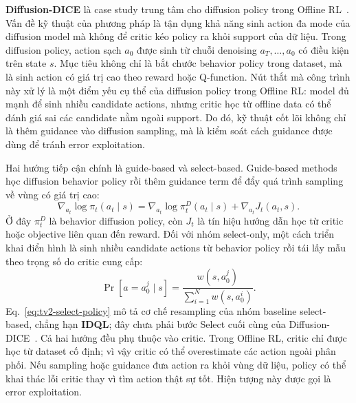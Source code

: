\textbf{Diffusion-DICE} là case study trung tâm cho diffusion policy trong Offline RL~\cite{mao2024diffusiondice}.
Vấn đề kỹ thuật của phương pháp là tận dụng khả năng sinh action đa mode của diffusion model mà không để critic kéo policy ra khỏi support của dữ liệu.
Trong diffusion policy, action sạch $a_0$ được sinh từ chuỗi denoising $a_T,\ldots,a_0$ có điều kiện trên state $s$.
Mục tiêu không chỉ là bắt chước behavior policy trong dataset, mà là sinh action có giá trị cao theo reward hoặc Q-function.
Nút thắt mà công trình này xử lý là một điểm yếu cụ thể của diffusion policy trong Offline RL: model đủ mạnh để sinh nhiều candidate actions, nhưng critic học từ offline data có thể đánh giá sai các candidate nằm ngoài support.
Do đó, kỹ thuật cốt lõi không chỉ là thêm guidance vào diffusion sampling, mà là kiểm soát cách guidance được dùng để tránh error exploitation.

Hai hướng tiếp cận chính là guide-based và select-based.
Guide-based methods học diffusion behavior policy rồi thêm guidance term để đẩy quá trình sampling về vùng có giá trị cao:
\begin{equation}
    \nabla_{a_t}
    \log \pi_t(a_t\mid s)
    =
    \nabla_{a_t}
    \log \pi_t^D(a_t\mid s)
    +
    \nabla_{a_t}J_t(a_t,s).
    \label{eq:tv2-guide-score}
\end{equation}
Ở đây $\pi_t^D$ là behavior diffusion policy, còn $J_t$ là tín hiệu hướng dẫn học từ critic hoặc objective liên quan đến reward.
Đối với nhóm select-only, một cách triển khai điển hình là sinh nhiều candidate actions từ behavior policy rồi tái lấy mẫu theo trọng số do critic cung cấp:
\begin{equation}
    \Pr[a=a_0^j\mid s]
    =
    \frac{
        w(s,a_0^j)
    }{
        \sum_{i=1}^{N} w(s,a_0^i)
    }.
    \label{eq:tv2-select-policy}
\end{equation}
Eq.~\eqref{eq:tv2-select-policy} mô tả cơ chế resampling của nhóm baseline select-based, chẳng hạn \textbf{IDQL}; đây chưa phải bước Select cuối cùng của Diffusion-DICE~\cite{hansenestruch2023idql}.
Cả hai hướng đều phụ thuộc vào critic.
Trong Offline RL, critic chỉ được học từ dataset cố định; vì vậy critic có thể overestimate các action ngoài phân phối.
Nếu sampling hoặc guidance đưa action ra khỏi vùng dữ liệu, policy có thể khai thác lỗi critic thay vì tìm action thật sự tốt.
Hiện tượng này được gọi là error exploitation.

